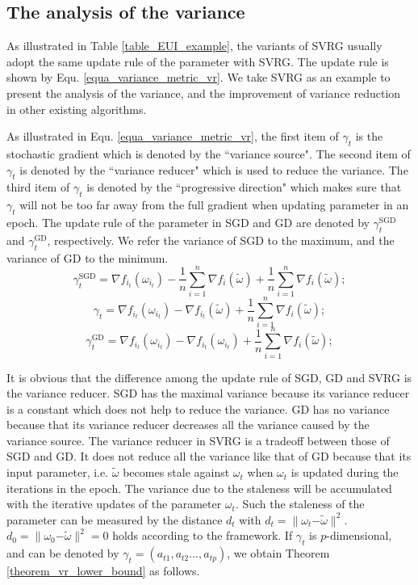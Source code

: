 \documentclass[letterpaper]{article}
\begin{document}
\subsection{The analysis of the variance}
\label{subsect_variance_analysis}
As illustrated  in Table \ref{table_EUI_example},  the variants of SVRG  usually adopt the same update rule of the parameter with SVRG. The update rule is shown by Equ. \ref{equa_variance_metric_vr}. We take SVRG  as an example to present the analysis of the variance, and the improvement of variance reduction in other existing algorithms.

As illustrated in Equ. \ref{equa_variance_metric_vr}, the first item of $\gamma_t$ is the stochastic gradient which is denoted by the ``variance source". The second item of $\gamma_t$ is denoted by the ``variance reducer" which is used to reduce the variance. The third item of $\gamma_t$ is denoted by the ``progressive direction" which makes sure that $\gamma_t$ will not be too far away from the full gradient when updating parameter in an epoch. The update rule of the parameter in SGD and GD are denoted by $\gamma_t^{\text{SGD}}$ and $\label{equa_variance_metric_gd}
\gamma_t^{\text{GD}}$, respectively.  We refer the variance of SGD to the maximum, and  the variance of GD to the minimum. 
\begin{equation}
\label{equa_variance_metric_sgd}
 \gamma_t^{\text{SGD}}=\nabla f_{i_t}(\omega_{i_t})-\frac{1}{n}\sum\limits_{i=1}^n\nabla f_i(\tilde{\omega})+\frac{1}{n}\sum\limits_{i=1}^n\nabla f_i(\tilde{\omega});
\end{equation}
\begin{equation}
\label{equa_variance_metric_vr}
\gamma_t=\nabla f_{i_t}(\omega_{i_t})-\nabla f_{i_t}(\tilde{\omega})+\frac{1}{n}\sum\limits_{i=1}^n\nabla f_i(\tilde{\omega});
\end{equation}
\begin{equation}
\label{equa_variance_metric_gd}
\gamma_t^{\text{GD}}=\nabla f_{i_t}(\omega_{i_t})-\nabla f_{i_t}(\omega_{i_t})+\frac{1}{n}\sum\limits_{i=1}^n\nabla f_i(\tilde{\omega});
\end{equation}

It is obvious that the difference among the update rule of SGD, GD and SVRG is the variance reducer. SGD has the maximal variance because its variance reducer  is a constant which does not help to reduce the variance. GD has no variance because that its variance reducer decreases all the variance caused by the variance source. The variance reducer in SVRG is a tradeoff  between those of SGD and GD. It does not reduce all the variance like that of GD because that its input parameter, i.e. $\tilde{\omega}$ becomes stale against $\omega_{t}$  when   $\omega_{t}$  is updated during the iterations in the epoch. The variance due to the staleness will be accumulated with the iterative updates of the parameter $\omega_{t}$.   Such the staleness of the parameter can be measured by  the distance $d_t$ with $d_t = \parallel \omega_{t} \mathrm{-} \tilde{\omega} \parallel^2$. $d_0 = \parallel \omega_{0}\mathrm{-}\tilde{\omega}\parallel^2 = 0$ holds according to the framework. If $\gamma_t$ is $p$-dimensional, and can be denoted by  $\gamma_t = (a_{t1}, a_{t2}..., a_{tp})$, we obtain Theorem \ref{theorem_vr_lower_bound}  as follows.
\end{document}
